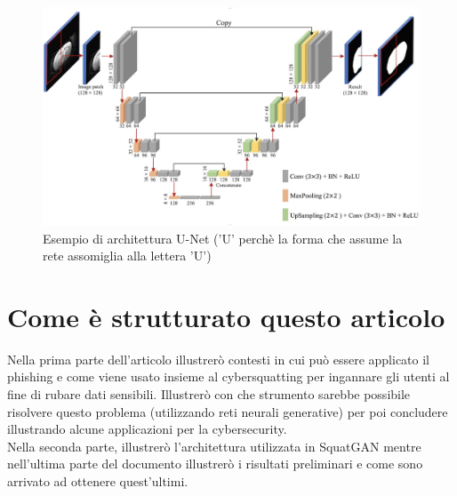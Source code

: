 \begin{figure}[!h]
  \centering
  \begin{minipage}[b]{\textwidth}
    \includegraphics[width=\textwidth]{pictures/unet.jpg}
    \caption{Esempio di architettura U-Net ('U' perchè la forma che assume la rete assomiglia alla lettera 'U')}
    \label{fig:unet}
  \end{minipage}
  \hfill
\end{figure}
\section{Come è strutturato questo articolo}
Nella prima parte dell'articolo illustrerò contesti in cui può essere applicato il phishing e come viene usato insieme al cybersquatting per ingannare gli utenti al fine di rubare dati sensibili. Illustrerò con che strumento sarebbe possibile risolvere questo problema (utilizzando reti neurali generative) per poi concludere illustrando alcune applicazioni per la cybersecurity.\\
Nella seconda parte, illustrerò l'architettura utilizzata in SquatGAN mentre nell'ultima parte del documento illustrerò i risultati preliminari e come sono arrivato ad ottenere quest'ultimi.
